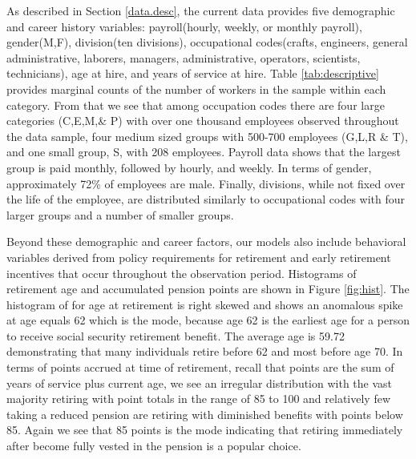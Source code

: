 \documentclass[12pt,letterpaper]{article}
\begin{document}
As described in Section \ref{data.desc}, the current data provides five demographic and career history variables: payroll(hourly, weekly, or monthly payroll), gender(M,F), division(ten divisions), occupational codes(crafts, engineers, general administrative, laborers, managers, administrative, operators, scientists, technicians), age at hire, and years of service at hire. Table \ref{tab:descriptive} provides marginal counts of the number of workers in the sample within each category.  From that we see that among occupation codes there are four large categories (C,E,M,\& P)  with over one thousand employees observed throughout the data sample, four medium sized groups with 500-700 employees (G,L,R \& T), and one small group, S, with 208 employees.  Payroll data shows that the largest group is paid monthly, followed by hourly, and weekly.  In terms of gender, approximately 72\% of employees are male. Finally, divisions, while not fixed over the life of the employee, are distributed similarly to occupational codes with four larger groups and a number of smaller groups.

Beyond these demographic and career factors, our models also include behavioral variables derived from policy requirements for retirement and early retirement incentives that occur throughout the observation period. Histograms of retirement age and accumulated pension points are shown in Figure \ref{fig:hist}. The histogram of for age at retirement is right skewed and shows an anomalous spike at age equals 62 which is the mode, because age 62 is the earliest age for a person to receive social security retirement benefit.
The average age is 59.72 demonstrating that many individuals retire before 62 and most before age 70. In terms of points accrued at time of retirement, recall that points are the sum of years of service plus current age, we see an irregular distribution with the vast majority retiring with point totals in the range of 85 to 100 and relatively few taking a reduced pension are retiring with diminished benefits with points below 85. Again we see that 85 points is the mode indicating that retiring immediately after become fully vested in the pension is a popular choice.
\end{document}
